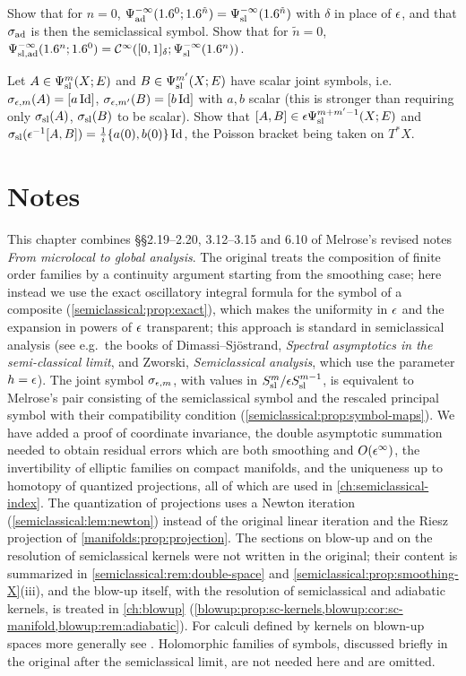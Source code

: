 \begin{exercise}\label{semiclassical:ex:adiabatic-n0}
  Show that for $n=0$, $\Psi^{-\infty}_{\mathrm{ad}}(1.6^0;1.6^{\tilde n})=\Psi^{-\infty}_{\mathrm{sl}}(1.6^{\tilde n})$ with $\delta$ in place of
  $\epsilon$, and that $\sigma_{\mathrm{ad}}$ is then the semiclassical symbol. Show that for
  $\tilde n=0$, $\Psi^{-\infty}_{\mathrm{sl,ad}}(1.6^n;1.6^0)=\mathcal{C}^\infty([0,1]_\delta;\Psi^{-\infty}_{\mathrm{sl}}(1.6^n))$.
\end{exercise}

\begin{exercise}\label{semiclassical:ex:commutator-order}
  Let $A\in\Psi^{m}_{\mathrm{sl}}(X;E)$ and $B\in\Psi^{m'}_{\mathrm{sl}}(X;E)$ have scalar joint symbols, i.e.\
  $\sigma_{\epsilon,m}(A)=[a\operatorname{Id}]$, $\sigma_{\epsilon,m'}(B)=[b\operatorname{Id}]$ with $a,b$ scalar (this is
  stronger than requiring only $\sigma_{\mathrm{sl}}(A)$, $\sigma_{\mathrm{sl}}(B)$ to be scalar). Show that
  $[A,B]\in\epsilon\Psi^{m+m'-1}_{\mathrm{sl}}(X;E)$ and $\sigma_{\mathrm{sl}}(\epsilon^{-1}[A,B])=\frac1i\{a(0),b(0)\}\operatorname{Id}$, the
  Poisson bracket being taken on $T^*X$.
\end{exercise}

\section*{Notes}
This chapter combines \S\S2.19--2.20, 3.12--3.15 and 6.10 of Melrose's revised notes
\emph{From microlocal to global analysis}. The original treats the composition of
finite order families by a continuity argument starting from the smoothing case; here
instead we use the exact oscillatory integral formula for the symbol of a composite
(\cref{semiclassical:prop:exact}), which makes the uniformity in $\epsilon$ and the
expansion in powers of $\epsilon$ transparent; this approach is standard in semiclassical
analysis (see e.g.\ the books of Dimassi--Sj\"ostrand, \emph{Spectral asymptotics in the
semi-classical limit}, and Zworski, \emph{Semiclassical analysis}, which use the
parameter $h=\epsilon$). The joint symbol $\sigma_{\epsilon,m}$, with values in
$S^{m}_{\mathrm{sl}}/\epsilon S^{m-1}_{\mathrm{sl}}$, is equivalent to Melrose's pair consisting of the semiclassical
symbol and the rescaled principal symbol with their compatibility condition
(\cref{semiclassical:prop:symbol-maps}). We have added a proof of coordinate invariance,
the double asymptotic summation needed to obtain residual errors which are both
smoothing and $O(\epsilon^\infty)$, the invertibility of elliptic families on compact
manifolds, and the uniqueness up to homotopy of quantized projections, all of which
are used in \cref{ch:semiclassical-index}. The quantization of projections uses a
Newton iteration (\cref{semiclassical:lem:newton}) instead of the original linear
iteration and the Riesz projection of \cref{manifolds:prop:projection}. The sections on
blow-up and on the resolution of semiclassical kernels were not written in the
original; their content is summarized in \cref{semiclassical:rem:double-space} and
\cref{semiclassical:prop:smoothing-X}(iii), and the blow-up itself, with the resolution
of semiclassical and adiabatic kernels, is treated in \cref{ch:blowup}
(\cref{blowup:prop:sc-kernels,blowup:cor:sc-manifold,blowup:rem:adiabatic}). For
calculi defined by kernels on blown-up spaces more generally see \cite{Melrose-APS}. Holomorphic
families of symbols, discussed briefly in the original after the semiclassical limit,
are not needed here and are omitted.
